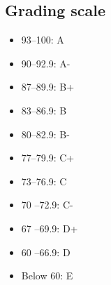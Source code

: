 \documentclass[12pt]{article}
\begin{document}
\subsection*{Grading scale}
\begin{itemize}
    \item 93–100: A
    \item 90–92.9: A-
    \item 87–89.9: B+
    \item 83–86.9: B
    \item 80–82.9: B-
    \item 77–79.9: C+
    \item 73–76.9: C
    \item 70 –72.9: C-
    \item 67 –69.9: D+
    \item 60 –66.9: D
    \item Below 60: E
\end{itemize}








\printbibliography
\end{document}
